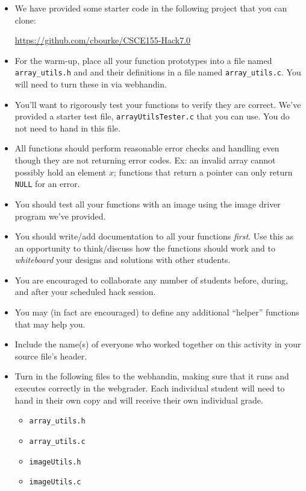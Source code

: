 \documentclass[12pt]{scrartcl}
\begin{document}
\begin{itemize}

  \item We have provided some starter code in the following project that
  you can clone:
  
  \url{https://github.com/cbourke/CSCE155-Hack7.0}

  \item For the warm-up, place all your function prototypes into a file 
  named \texttt{array_utils.h} and and their definitions in a
  file named \texttt{array_utils.c}.  You will need to turn
  these in via webhandin.
  
  \item You'll want to rigorously test your functions to verify they
  are correct.  We've provided a starter test file, 
  \texttt{arrayUtilsTester.c} that you can use.  You 
  do not need to hand in this file.
  
  \item All functions should perform reasonable error checks and
  handling even though they are not returning error codes.  Ex:
  an invalid array cannot possibly hold an element $x$; functions
  that return a pointer can only return \texttt{NULL} for
  an error.
  
  \item You should test all your functions with an image using the
  image driver program we've provided.
  
  \item You should write/add documentation to all your functions
  \emph{first}. Use this as an opportunity to think/discuss how the 
  functions should work and
  to \emph{whiteboard} your designs and solutions with other students.
  
  \item You are encouraged to collaborate any number of students 
  before, during, and after your scheduled hack session.  

  \item You may (in fact are encouraged) to define any additional
  ``helper'' functions that may help you.

  \item Include the name(s) of everyone who worked together on
  this activity in your source file's header.

  \item Turn in the following files to the webhandin, making sure that 
  it runs and executes correctly in the webgrader.  Each individual 
  student will need to hand in their own copy and will receive 
  their own individual grade.
  \begin{itemize}
    \item \texttt{array_utils.h} 
    \item \texttt{array_utils.c} 
    \item \texttt{imageUtils.h} 
    \item \texttt{imageUtils.c}
  \end{itemize}

\end{itemize}  
\end{document}
